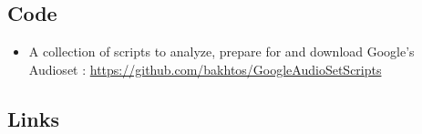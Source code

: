 \documentclass[11pt]{article}
\begin{document}
\subsection{Code}

\begin{itemize}
  \item A collection of scripts to analyze, prepare for and download Google's Audioset : \url{https://github.com/bakhtos/GoogleAudioSetScripts}
  \label{item:google-audioset-reformatted}
\end{itemize}

\subsection{Links}

\pagebreak



\end{document}
